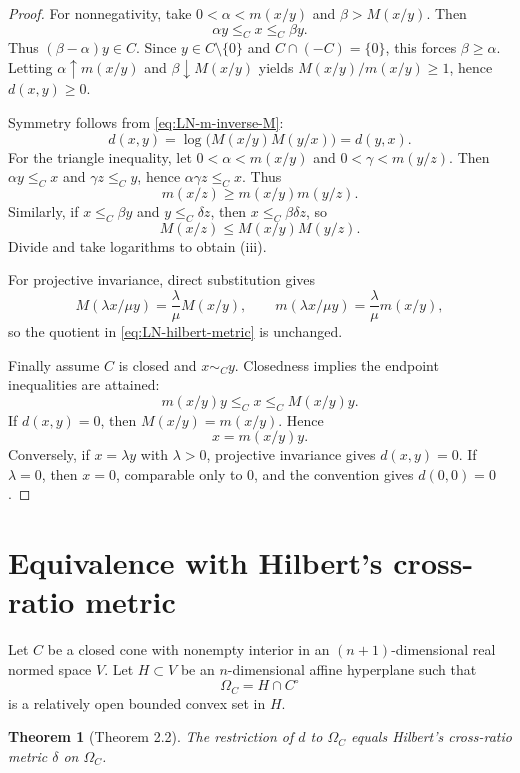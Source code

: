 \documentclass[11pt]{article}
\newtheorem{theorem}{Theorem}
\begin{document}
\begin{proof}
For nonnegativity, take \(0<\alpha<m(x/y)\) and \(\beta>M(x/y)\).  Then
\[
  \alpha y\le_C x\le_C \beta y.
\]
Thus \((\beta-\alpha)y\in C\).  Since \(y\in C\setminus\{0\}\) and \(C\cap(-C)=\{0\}\), this forces \(\beta\ge\alpha\).  Letting \(\alpha\uparrow m(x/y)\) and \(\beta\downarrow M(x/y)\) yields \(M(x/y)/m(x/y)\ge1\), hence \(d(x,y)\ge0\).

Symmetry follows from \eqref{eq:LN-m-inverse-M}:
\[
  d(x,y)=\log\bigl(M(x/y)M(y/x)\bigr)=d(y,x).
\]
For the triangle inequality, let \(0<\alpha<m(x/y)\) and \(0<\gamma<m(y/z)\).  Then \(\alpha y\le_C x\) and \(\gamma z\le_C y\), hence \(\alpha\gamma z\le_C x\).  Thus
\[
  m(x/z)\ge m(x/y)m(y/z).
\]
Similarly, if \(x\le_C \beta y\) and \(y\le_C \delta z\), then \(x\le_C\beta\delta z\), so
\[
  M(x/z)\le M(x/y)M(y/z).
\]
Divide and take logarithms to obtain (iii).

For projective invariance, direct substitution gives
\[
  M(\lambda x/\mu y)=\frac{\lambda}{\mu}M(x/y),
  \qquad
  m(\lambda x/\mu y)=\frac{\lambda}{\mu}m(x/y),
\]
so the quotient in \eqref{eq:LN-hilbert-metric} is unchanged.

Finally assume \(C\) is closed and \(x\sim_C y\).  Closedness implies the endpoint inequalities are attained:
\[
  m(x/y)y\le_C x\le_C M(x/y)y.
\]
If \(d(x,y)=0\), then \(M(x/y)=m(x/y)\).  Hence
\[
  x=m(x/y)y.
\]
Conversely, if \(x=\lambda y\) with \(\lambda>0\), projective invariance gives \(d(x,y)=0\).  If \(\lambda=0\), then \(x=0\), comparable only to \(0\), and the convention gives \(d(0,0)=0\).
\end{proof}

\section{Equivalence with Hilbert's cross-ratio metric}
Let \(C\) be a closed cone with nonempty interior in an \((n+1)\)-dimensional real normed space \(V\).  Let \(H\subset V\) be an \(n\)-dimensional affine hyperplane such that
\[
  \Omega_C=H\cap C^\circ
\]
is a relatively open bounded convex set in \(H\).

\begin{theorem}[Theorem 2.2]
The restriction of \(d\) to \(\Omega_C\) equals Hilbert's cross-ratio metric \(\delta\) on \(\Omega_C\).
\end{theorem}
\end{document}
